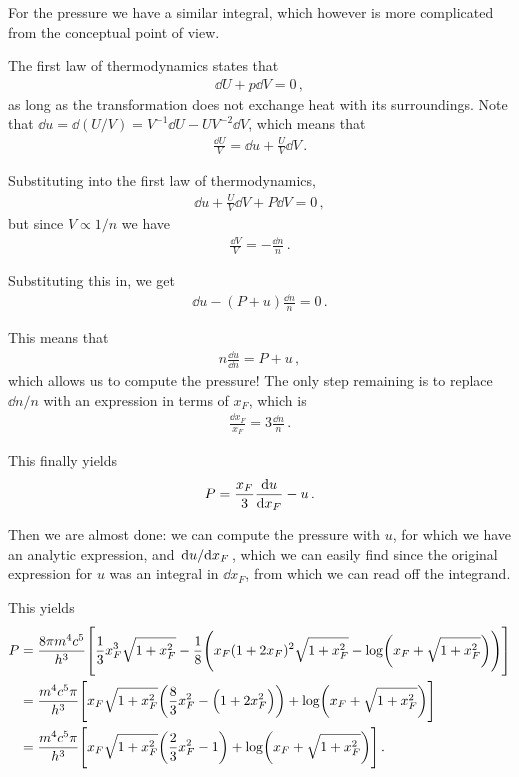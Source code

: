 \documentclass[main.tex]{subfiles}
\begin{document}
For the pressure we have a similar integral, which however is more complicated from the conceptual point of view. 

The first law of thermodynamics states that 
%
\begin{align}
\dd{U} + p \dd{V} = 0
\,,
\end{align}
%
as long as the transformation does not exchange heat with its surroundings. 
Note that \(\dd{u} = \dd{(U/ V)} = V^{-1} \dd{U} - U V^{-2} \dd{V}\), which means that 
%
\begin{align}
\frac{ \dd{U}}{V} = \dd{u} + \frac{U}{V} \dd{V}
\,.
\end{align}

Substituting into the first law of thermodynamics, 
%
\begin{align}
\dd{u} + \frac{U}{V} \dd{V} + P \dd{V} = 0
\,,
\end{align}
%
but since \(V \propto 1/n\) we have 
%
\begin{align}
\frac{ \dd{V}}{V} = - \frac{ \dd{n}}{n}
\,.
\end{align}

Substituting this in, we get 
%
\begin{align}
\dd{u} - (P+u) \frac{ \dd{n}}{n} = 0 
\,.
\end{align}

This means that 
%
\begin{align}
n \frac{\dd{u}}{ \dd{n}} = P + u
\,,
\end{align}
%
which allows us to compute the pressure! 
The only step remaining is to replace \(\dd{n} / n\) with an expression in terms of \(x_F\), which is 
%
\begin{align}
\frac{ \dd{x_F}}{x_F} = 3 \frac{ \dd{n}}{n}
\,.
\end{align}

This finally yields 
%
\begin{align}
P = \frac{x_F}{3} \dv{u}{x_F} - u
\,.
\end{align}

Then we are almost done: we can compute the pressure with \(u\), for which we have an analytic expression, and \(\dv*{u}{x_F}\), which we can easily find since the original expression for \(u\) was an integral in \(\dd{x_F}\), from which we can read off the integrand. 

This yields 
%
\begin{align}
P &= \frac{8 \pi m^4 c^{5}}{h^3} \qty[ 
    \frac{1}{3} x_F^3 \sqrt{1 + x_F^2 } 
    - \frac{1}{8} \qty(x_F (1 + 2 x_F)^2 \sqrt{1 + x_F^2} 
    - \log(x_F + \sqrt{1 + x_F^2}))
]  \\
&= \frac{m^4 c^{5} \pi }{h^3}
\qty[
    x_F \sqrt{1 + x_F^2}
    \qty( \frac{8}{3} x_F^2 - \qty(1 + 2 x_F^2))
    + \log(x_F + \sqrt{1 + x_F^2})
]  \\
&= \frac{m^4 c^{5} \pi }{h^3} \qty[
    x_F \sqrt{1+ x_F^2} 
    \qty( \frac{2}{3} x_F^2 - 1)
    +
    \log(x_F + \sqrt{1 + x_F^2})
]
\,.
\end{align}
\end{document}

